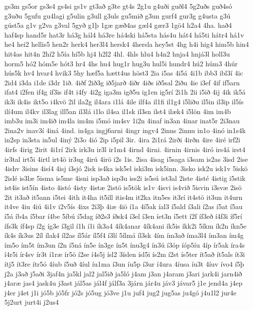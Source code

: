 {gs3m
gs5or
gs3s4
gs4si
gs1v
gt3að
g3te
gt4s
2g1u
g4uði
guðl4
5g2uðs
guð4só
g3uðu
5gufu
gu4lagi
g5ulin
g3ull
g3uls
gu5mið
g3un
gurf4
gur3g
g4usta
g3ú
gúst5a
g1v
g2va
g3val
5gyð
g1þ
1gæ
gæð4as
gæl4
gær3
1gö4
h2a4
4ha.
hað4
haf4sp
hand5r
hat3r
há3g
hál4
há3re
há4ski
há5sta
hás4u
hát4
há5ti
hátr4
há1v
he4
hei2
hellis5
hen2r
herk4
her3l4
hersk4
4hersla
hey5st
4hg
h4i
hig4
him5b
hin4
hit4as
hit4n
2hí2
h5ía
hí5b
hj4
h2l2
4hl.
4hls
hlu4
h4n2
hnja4
hnjá3l
holl3u
horm5
hó2
hóm5e
hót3
hr4
4hs
hu4
hug1r
hug3u
hul5i
hundr4
hú2
húm3
4húr
hús5k
hv4
hvar4
hvik3
5hy
hæf5a
hætt4us
höst3
2ia
i5as
4i5á
4i1b
ibb3
ibl3í
4ic
2id4
i3da
i1de
i3dr
1ið.
4iðf
2ið3g
ið5jarð
4iðr
4iðs
ið5sal
2iðu
4ie
i3ef
4if
if5arn
ifat4
i2fen
if4g
if3is
if4t
i4fy
4i2g
iga3m
igð5u
ig1en
ig5rí
2i1h
2ii
i5ið
4ij
4ik
ik5á
ik3i
ik4is
ikt5o
i4kvö
2il
ila2g
il4ara
i1lá
4ile
ilf4a
il1fi
il1g4
i5liðu
il5in
il3ip
il5ís
ilí4um
il4kv
il3lag
ill5an
il3lá
i1lo
il4sa
il1sk
il3sn
ilst4
ilæk4
i5lön
4im
im4b
imb3u
im3i
im4ið
im4la
im4m
i5mó
im4sv
1i2n
4inaf
in3an
4inar
inat5r
2i3nau
2ina2v
inav3í
4iná
4ind.
in4ga
ingj6arni
4ingr
ingv4
2inns
2innu
in1o
4inó
in1s4k
in2sp
in3sta
in5ul
4iný
2i3o
4ió
2ip
i5pil
3ir.
4ira
2i1rá
2irði
4irðn
4ire
4iré
irf2i
4irfs
4irig
2irit
4i1rí
2irk
irk3u
ir3l
ir1m4
4irnd
4irni.
4irnin
4irnis
4iró
irs4á
irst4
ir3tal
irt5i
4irtl
irt4ö
ir3ug
4irú
4irö
i2s
1is.
2isa
4isag
i5saga
i3sam
is2as
3isd
2ise
4ishv
3isins
4isí4
4isj
i3sjó
2isk
is4ka
isk5el
iski3m
isk5inn.
3isko
isk2u
isk1v
5iskö
2islé
is3læ
5isma
is5me
4isni
isp3að
isp3u
iss2i
is5sú
ist3al
2iste
4isté
4istig
i5stik
ist4is
ist5ín
4isto
4istó
4isty
4istæ
2istö
is5tök
is1v
4isvi
is4við
5isvin
i3svæ
2isö
2it
it3að
it5ann
i5tei
4ith
it4ha
it5ill
itis4m
it2ka
itn5es
it3rí
it4stö
it3un
it4urn
it4ve
4iu
4iú
4i1v
i2v5ís
4ixs
2i3þ
4iæ
4iö
í1a
4í5ak
íal3
í5ald
í3ali
í2as
í5at
í5au
í5á
íb4a
í5bar
í4be
5íbú
í5dag
íð2s3
íðsk4
í3el
í3en
íet3n
í5ett
í2f
íf3eð
í4f3i
íf5rí
ífs3k
íf4sp
í2g
íg3e
í3gil
í1h
í1i
ík3a4
4ík4anar
4ík4ani
ík5is
íkk2i
5íkm
ík2n
íkn5e
ík4s
ík3us
2íl
ílak4
íl2as
íl5ár
íl5f4
í3lí
5ílmá
íl3sk
4ím
ím3að
íma3l4
ím3an
ím4g
ím5o
ím5t
ím3un
í2n
í5ná
ín5e
ín3ge
ín5t
ínu3g4
ín3ú
í3óp
íóp5íu
4íp
ír5ak
íra4s
í4r5i
ír4sv
ír3t
í1ræ
ír5ö
í2se
í4s5j
ísl2
3íslen
ísl5i
ís2m
í2st
ís5ter
ít5að
ít5als
ít3i
ítj5
ít3re
ítr5ó
4íub
í5uð
4íul
íu1ma
í3un
íu5p
í3ur
í4ura
4íusa
íu3t
4íuv
ívo4
í5þ
j2a
j3að
j5aði
3jaf4n
ja5kl
jal2
jal5ið
ja5ló
j4am
j3an
j4aram
j3ari
jark4i
jarn4ið
j4aræ
jas4
jask4u
j3ast
jál5as
jál4f
jálf3a
3járn
jár4u
jáv3
jávar5
j1e
jend4a
j4ep
j4er
j4et
j1i
jó5b
jó5fr
jó2s
jó5ug
jó3ve
j1u
juf4
jug2
jug5as
ju4gó
j4u1l2
jur4e
5j2urt
jurt4i
j2us4
}
